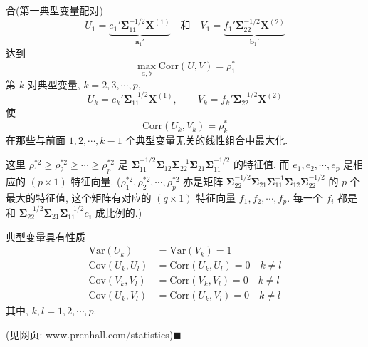 
合(第一典型变量配对)
\[
U_1=\underbrace{e_1'\boldsymbol{\Sigma}_{11}^{-1/2}\mathbf{X}^{(1)}}_{\mathbf{a}_1'}\quad \text{和}\quad V_1=\underbrace{f_1'\boldsymbol{\Sigma}_{22}^{-1/2}\mathbf{X}^{(2)}}_{\mathbf{b}_1'}
\]
达到
\[
\max_{a,b}\mathrm{Corr}(U,V)=\rho_1^*
\]
第 $k$ 对典型变量, $k=2,3,\cdots,p$,
\[
U_k=e_k'\boldsymbol{\Sigma}_{11}^{-1/2}\mathbf{X}^{(1)},\qquad V_k=f_k'\boldsymbol{\Sigma}_{22}^{-1/2}\mathbf{X}^{(2)}
\]
使
\[
\mathrm{Corr}(U_k,V_k)=\rho_k^*
\]
在那些与前面 $1,2,\cdots,k-1$ 个典型变量无关的线性组合中最大化.

这里 $\rho_1^{*2}\ge\rho_2^{*2}\ge\cdots\ge\rho_p^{*2}$ 是 $\boldsymbol{\Sigma}_{11}^{-1/2}\boldsymbol{\Sigma}_{12}\boldsymbol{\Sigma}_{22}^{-1}\boldsymbol{\Sigma}_{21}\boldsymbol{\Sigma}_{11}^{-1/2}$ 的特征值, 而 $e_1,e_2,\cdots,e_p$ 是相应的 $(p\times 1)$ 特征向量. ($\rho_1^{*2},\rho_2^{*2},\cdots,\rho_p^{*2}$ 亦是矩阵 $\boldsymbol{\Sigma}_{22}^{-1/2}\boldsymbol{\Sigma}_{21}\boldsymbol{\Sigma}_{11}^{-1}\boldsymbol{\Sigma}_{12}\boldsymbol{\Sigma}_{22}^{-1/2}$ 的 $p$ 个最大的特征值, 这个矩阵有对应的 $(q\times 1)$ 特征向量 $f_1,f_2,\cdots,f_p$. 每一个 $f_i$ 都是和 $\boldsymbol{\Sigma}_{22}^{-1/2}\boldsymbol{\Sigma}_{21}\boldsymbol{\Sigma}_{11}^{-1/2}e_i$ 成比例的.)

典型变量具有性质
\[
\begin{aligned}
\mathrm{Var}(U_k)&=\mathrm{Var}(V_k)=1\\
\mathrm{Cov}(U_k,U_l)&=\mathrm{Corr}(U_k,U_l)=0\quad k\ne l\\
\mathrm{Cov}(V_k,V_l)&=\mathrm{Corr}(V_k,V_l)=0\quad k\ne l\\
\mathrm{Cov}(U_k,V_l)&=\mathrm{Corr}(U_k,V_l)=0\quad k\ne l
\end{aligned}
\]
其中, $k,l=1,2,\cdots,p$.

\noindent{}\quad (见网页: www.prenhall.com/statistics)\hfill$\blacksquare$


